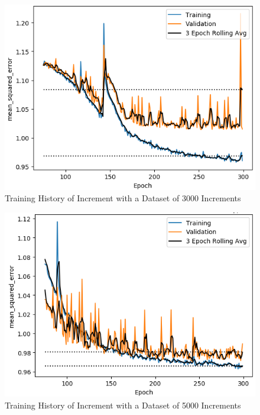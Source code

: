 \begin{figure}[b]
	\centering
	\includegraphics[scale=0.75]{Figures/TrainHistory_dataset_cases3000_C0_321_L0_13_0_321_0_13_48_1_allI0.png}
	\caption{Training History of Increment with a Dataset of 3000 Increments}
	\label{fig:history_3000}
\end{figure}

\begin{figure}[b]
	\centering
	\includegraphics[scale=0.75]{Figures/TrainHistory_dataset_cases5000_C0_321_L0_13_0_321_0_13_48_1_allI0.png}
	\caption{Training History of Increment with a Dataset of 5000 Increments}
	\label{fig:history_5000}
\end{figure}

